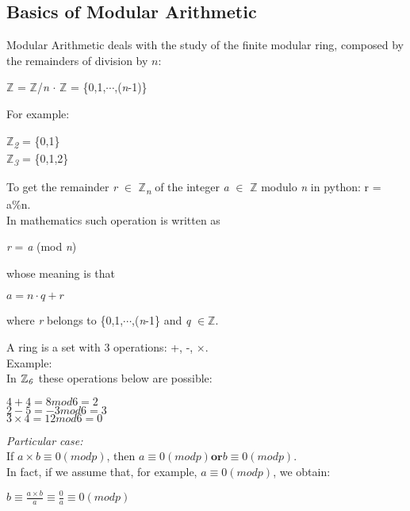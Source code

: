 \documentclass{article}
\begin{document}
\subsection{Basics of Modular Arithmetic}
Modular Arithmetic deals with the study of the finite modular ring, composed by the remainders of division by $n$:\\
\begin{center}
$\mathbb{Z}$ = $\mathbb{Z}$/\textit{n} $\cdot$  $ \mathbb{Z}$  = \{0,1,$\cdots$,(\textit{n}-1)\}
\end{center}

For example:\\
\begin{center}
$\mathbb{Z}$\textsubscript{\textit{2}} = \{0,1\} \\
$\mathbb{Z}$\textsubscript{\textit{3}} = \{0,1,2\} \\
\end{center}

To get the remainder \textit{r} $\in$ $\mathbb{Z}$\textsubscript{\textit{n}} of the integer \textit{a} $\in$ $\mathbb{Z}$ modulo \textit{n} in python: r = a\%n.\\
In mathematics such operation is written as\\

\begin{center}
\textit{r} = \textit{a} (mod \textit{n})
\end{center}

whose meaning is that\\

\begin{center}
$a = n \cdot q + r$
\end{center}

where \textit{r} belongs to \{0,1,$\cdots$,(\textit{n}-1\} and \textit{q} $\in \mathbb{Z}$.

A ring is a set with 3 operations: +, -, $\times$.\\
Example:\\
In $\mathbb{Z}\textsubscript{\textit{6}}$ these operations below are possible:\\
\begin{center}
$4 + 4 = 8mod6 = 2$\\
$2 - 5 = -3mod6 = 3$\\
$3 \times 4 = 12mod6 = 0$
\end{center}

\textit{Particular case:}\\
If $a \times b \equiv 0 (mod p)$, then $a \equiv 0 (mod p)         \textbf{or}  b \equiv 0 (mod p)$.\\ In fact, if we assume that, for example, $a \equiv 0 (mod p)$, we obtain:\\
\begin{center}
$b \equiv \frac{a \times b}{a} \equiv \frac{0}{a} \equiv 0 (mod p)$\\
\end{center}
\end{document}
